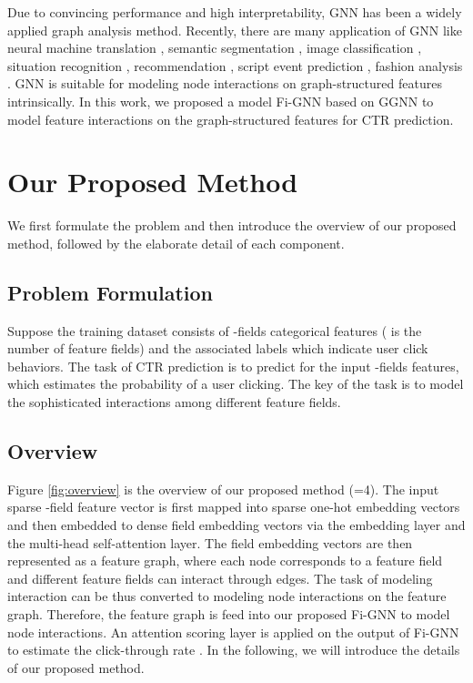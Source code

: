 \documentclass[sigconf]{acmart}
\begin{document}
Due to convincing performance and high interpretability, GNN has been a widely applied graph analysis method.
Recently, there are many application of GNN like neural machine translation \cite{beck2018graph}, semantic segmentation \cite{qi20173d}, image classification \cite{marino2017more}, situation recognition \cite{li2017situation}, recommendation \cite{Wu2018Session}, script event prediction \cite{Zhongyang2018Constructing}, fashion analysis \cite{cui2019dressing,li2019semi}.
GNN is suitable for modeling node interactions on graph-structured features intrinsically.
In this work, we proposed a model Fi-GNN based on GGNN to model feature interactions on the graph-structured features for CTR prediction. 

\section{Our Proposed Method}
We first formulate the problem and then introduce the overview of our proposed method, followed by the elaborate detail of each component.
 
\subsection{Problem Formulation}
Suppose the training dataset consists of -fields categorical features ( is the number of feature fields) and the associated labels  which indicate user click behaviors.
The task of CTR prediction is to predict  for the input -fields features, which estimates the probability of a user clicking.
The key of the task is to model the sophisticated interactions among different feature fields.

\subsection{Overview}
Figure \ref{fig:overview} is the overview of our proposed method (=4).   
The input sparse -field feature vector is first mapped into sparse one-hot embedding vectors and then embedded to dense field embedding vectors via the embedding layer and the multi-head self-attention layer. 
The field embedding vectors are then represented as a feature graph, where each node corresponds to a feature field and different feature fields can interact through edges.
The task of modeling interaction can be thus converted to modeling node interactions on the feature graph.
Therefore, the feature graph is feed into our proposed Fi-GNN to model node interactions.  
An attention scoring layer is applied on the output of Fi-GNN to estimate the click-through rate . 
In the following, we will introduce the details of our proposed method.
    
\end{document}
